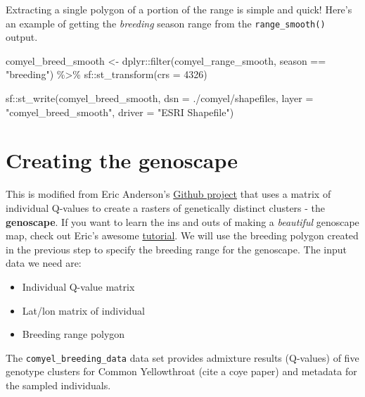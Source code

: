 \documentclass[
]{book}
\newenvironment{Shaded}{\begin{snugshade}}{\end{snugshade}}
\newcommand{\AttributeTok}[1]{\textcolor[rgb]{0.77,0.63,0.00}{#1}}
\newcommand{\DecValTok}[1]{\textcolor[rgb]{0.00,0.00,0.81}{#1}}
\newcommand{\FunctionTok}[1]{\textcolor[rgb]{0.00,0.00,0.00}{#1}}
\newcommand{\NormalTok}[1]{#1}
\newcommand{\OtherTok}[1]{\textcolor[rgb]{0.56,0.35,0.01}{#1}}
\newcommand{\SpecialCharTok}[1]{\textcolor[rgb]{0.00,0.00,0.00}{#1}}
\newcommand{\StringTok}[1]{\textcolor[rgb]{0.31,0.60,0.02}{#1}}
\providecommand{\tightlist}{%
  \setlength{\itemsep}{0pt}\setlength{\parskip}{0pt}}
\begin{document}
Extracting a single polygon of a portion of the range is simple and quick! Here's an example of getting the \emph{breeding} season range from the \texttt{range\_smooth()} output.

\begin{Shaded}
\begin{Highlighting}[]
\NormalTok{comyel\_breed\_smooth }\OtherTok{\textless{}{-}}\NormalTok{ dplyr}\SpecialCharTok{::}\FunctionTok{filter}\NormalTok{(comyel\_range\_smooth,}
\NormalTok{                                season }\SpecialCharTok{==} \StringTok{"breeding"}\NormalTok{) }\SpecialCharTok{\%\textgreater{}\%}
\NormalTok{                    sf}\SpecialCharTok{::}\FunctionTok{st\_transform}\NormalTok{(}\AttributeTok{crs =} \DecValTok{4326}\NormalTok{)}

\NormalTok{sf}\SpecialCharTok{::}\FunctionTok{st\_write}\NormalTok{(comyel\_breed\_smooth, }\AttributeTok{dsn =} \StringTok{\textquotesingle{}./comyel/shapefiles\textquotesingle{}}\NormalTok{,}
          \AttributeTok{layer =} \StringTok{"comyel\_breed\_smooth"}\NormalTok{,}
          \AttributeTok{driver =} \StringTok{"ESRI Shapefile"}\NormalTok{)}
\end{Highlighting}
\end{Shaded}

\hypertarget{creating-the-genoscape}{%
\section{Creating the genoscape}\label{creating-the-genoscape}}

This is modified from Eric Anderson's \href{https://github.com/eriqande/make-a-BGP-map}{Github project} that uses a matrix of individual Q-values to create a rasters of genetically distinct clusters - the \textbf{genoscape}. If you want to learn the ins and outs of making a \emph{beautiful} genoscape map, check out Eric's awesome \href{https://github.com/eriqande/make-a-BGP-map}{tutorial}. We will use the breeding polygon created in the previous step to specify the breeding range for the genoscape. The input data we need are:

\begin{itemize}
\tightlist
\item
  Individual Q-value matrix
\item
  Lat/lon matrix of individual
\item
  Breeding range polygon
\end{itemize}

The \texttt{comyel\_breeding\_data} data set provides admixture results (Q-values) of five genotype clusters for Common Yellowthroat (cite a coye paper) and metadata for the sampled individuals.
\end{document}
